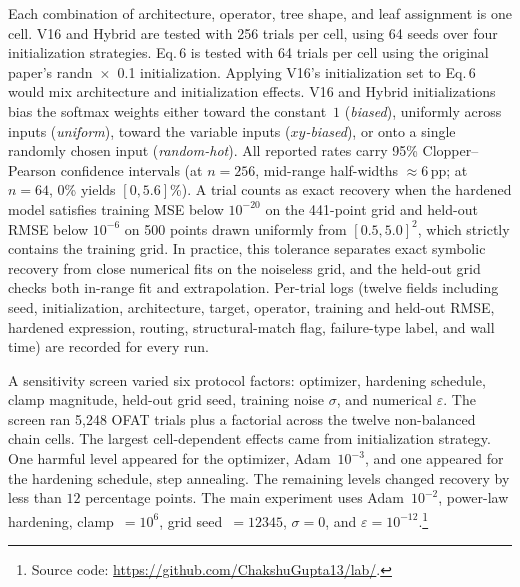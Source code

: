 Each combination of architecture, operator, tree shape, and leaf
assignment is one cell.  V16 and Hybrid are tested with 256
trials per cell, using 64 seeds over four initialization
strategies.  Eq.\,6 is tested with 64 trials per cell using the
original paper's randn~$\times$~0.1 initialization.  Applying
V16's initialization set to Eq.\,6 would mix architecture and
initialization effects.  V16 and Hybrid initializations bias the
softmax weights either toward the constant~$1$ (\emph{biased}),
uniformly across inputs (\emph{uniform}), toward the variable
inputs (\emph{$xy$-biased}), or onto a single randomly chosen
input (\emph{random-hot}).  All reported rates carry 95\% Clopper--Pearson
confidence intervals (at $n = 256$,
mid-range half-widths $\approx$6\,pp; at $n = 64$,
0\% yields $[0, 5.6]$\%).  A trial counts as exact recovery when
the hardened model satisfies training MSE below $10^{-20}$ on the
441-point grid and held-out RMSE below $10^{-6}$ on 500 points
drawn uniformly from $[0.5,5.0]^2$, which strictly contains the
training grid.  In practice, this tolerance separates exact
symbolic recovery from close numerical fits on the noiseless
grid, and the held-out grid checks both in-range fit and
extrapolation.
Per-trial logs (twelve fields including seed, initialization,
architecture, target, operator, training and held-out RMSE,
hardened expression, routing, structural-match flag, failure-type
label, and wall time) are recorded for every run.

A sensitivity screen varied six protocol factors: optimizer,
hardening schedule, clamp magnitude, held-out grid seed,
training noise $\sigma$, and numerical $\varepsilon$.  The screen
ran 5{,}248 OFAT trials plus a factorial across the twelve
non-balanced chain cells.  The largest cell-dependent effects
came from initialization strategy.  One harmful level appeared
for the optimizer, Adam~$10^{-3}$, and one appeared for the
hardening schedule, step annealing.  The remaining levels
changed recovery by less than $12$ percentage points.  The main experiment
uses Adam~$10^{-2}$, power-law hardening, clamp~$=10^6$, grid
seed~$=12345$, $\sigma=0$, and $\varepsilon=10^{-12}$.\footnote{Source
code: \url{https://github.com/ChakshuGupta13/lab/}.}
